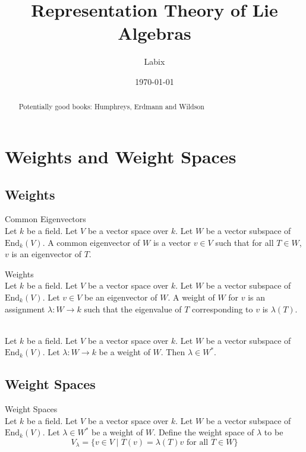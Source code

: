 \documentclass[a4paper]{article}
\title{Representation Theory of Lie Algebras}
\author{Labix}
\date{\today}
\begin{document}
\maketitle
\begin{abstract}
Potentially good books: Humphreys, Erdmann and Wildson
\end{abstract}
\pagebreak
\tableofcontents

\pagebreak
\section{Weights and Weight Spaces}
\subsection{Weights}
\begin{defn}{Common Eigenvectors}{} \\Let $k$ be a field. Let $V$ be a vector space over $k$. Let $W$ be a vector subspace of $\text{End}_k(V)$. A common eigenvector of $W$ is a vector $v\in V$ such that for all $T\in W$, $v$ is an eigenvector of $T$. 
\end{defn}

\begin{defn}{Weights}{} \\Let $k$ be a field. Let $V$ be a vector space over $k$. Let $W$ be a vector subspace of $\text{End}_k(V)$. Let $v\in V$ be an eigenvector of $W$. A weight of $W$ for $v$ is an assignment $\lambda:W\to k$ such that the eigenvalue of $T$ corresponding to $v$ is $\lambda(T)$. 
\end{defn}

\begin{lmm}{}{} \\Let $k$ be a field. Let $V$ be a vector space over $k$. Let $W$ be a vector subspace of $\text{End}_k(V)$. Let $\lambda:W\to k$ be a weight of $W$. Then $\lambda\in W^\ast$. 
\end{lmm}

\subsection{Weight Spaces}
\begin{defn}{Weight Spaces}{} \\Let $k$ be a field. Let $V$ be a vector space over $k$. Let $W$ be a vector subspace of $\text{End}_k(V)$. Let $\lambda\in W^\ast$ be a weight of $W$. Define the weight space of $\lambda$ to be $$V_\lambda=\{v\in V\;|\;T(v)=\lambda(T)v\text{ for all }T\in W\}$$
\end{defn}
\end{document}

